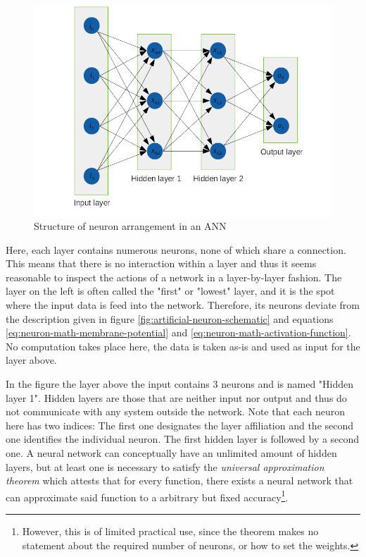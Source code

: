 \documentclass[11pt, a4paper]{article}
\begin{document}
\begin{figure}[htp]
\centering
\includegraphics[width=\textwidth]{images/network_layout.png}
\caption{Structure of neuron arrangement in an ANN}
\label{fig:neural-nework-structure}
\end{figure}

Here, each layer contains numerous neurons, none of which share a connection. This means that there is no interaction within a layer and thus it seems reasonable to inspect the actions of a network in a layer-by-layer fashion. The layer on the left is often called the "first" or "lowest" layer, and it is the spot where the input data is feed into the network. Therefore, its neurons deviate from the description given in figure \ref{fig:artificial-neuron-schematic} and equations \eqref{eq:neuron-math-membrane-potential} and \eqref{eq:neuron-math-activation-function}. No computation takes place here, the data is taken as-is and used as input for the layer above.

In the figure the layer above the input contains 3 neurons and is named "Hidden layer 1". Hidden layers are those that are neither input nor output and thus do not communicate with any system outside the network. Note that each neuron here has two indices: The first one designates the layer affiliation and the second one identifies the individual neuron. The first hidden layer is followed by a second one. A neural network can conceptually have an unlimited amount of hidden layers, but at least one is necessary to satisfy the \emph{universal approximation theorem} which attests that for every function, there exists a neural network that can approximate said function to a arbitrary but fixed accuracy\footnote{However, this is of limited practical use, since the theorem makes no statement about the required number of neurons, or how to set the weights.}.
\end{document}

